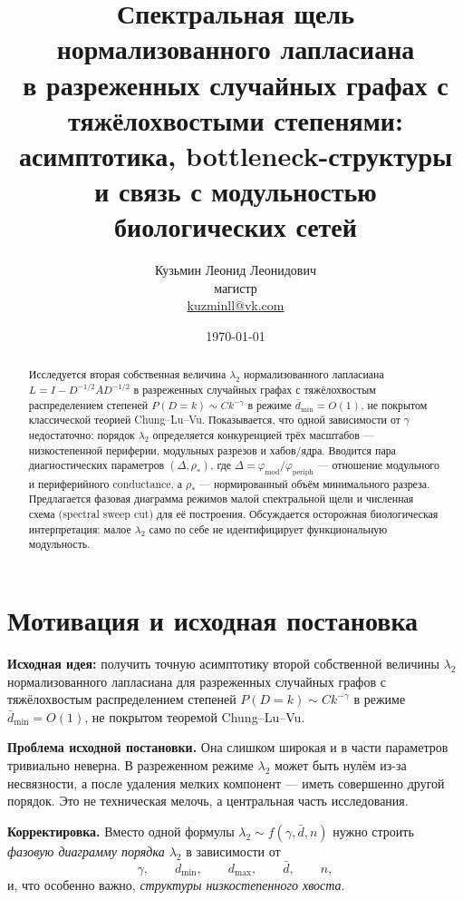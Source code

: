 \documentclass[11pt,a4paper]{article}
\title{\bfseries Спектральная щель нормализованного лапласиана\\
в разреженных случайных графах с тяжёлохвостыми степенями:\\
асимптотика, bottleneck-структуры и связь с модульностью\\
биологических сетей}
\author{Кузьмин Леонид Леонидович\\[2pt]
\small магистр\\
\small\href{mailto:kuzminll@vk.com}{kuzminll@vk.com}}
\date{\today}
\theoremstyle{plain}
\theoremstyle{definition}
\theoremstyle{remark}
\newcommand{\periph}{\mathrm{periph}}
\newcommand{\modu}{\mathrm{mod}}
\newcommand{\Ph}{\varphi}
\newcommand{\dmin}{d_{\min}}
\newcommand{\dmax}{d_{\max}}
\newcommand{\dbar}{\bar d}
\newcommand{\lamtwo}{\lambda_2}
\begin{document}
\maketitle

\begin{abstract}
\noindent
Исследуется вторая собственная величина $\lamtwo$ нормализованного лапласиана
$L=I-D^{-1/2}AD^{-1/2}$ в разреженных случайных графах с тяжёлохвостым
распределением степеней $P(D=k)\sim Ck^{-\gamma}$ в режиме
$\dbar_{\min}=O(1)$, не покрытом классической теорией Chung--Lu--Vu.
Показывается, что одной зависимости от $\gamma$ недостаточно: порядок $\lamtwo$
определяется конкуренцией трёх масштабов --- низкостепенной периферии,
модульных разрезов и хабов/ядра. Вводится пара диагностических параметров
$(\Delta,\rho_*)$, где $\Delta=\Ph_{\modu}/\Ph_{\periph}$ --- отношение
модульного и периферийного conductance, а $\rho_*$ --- нормированный объём
минимального разреза. Предлагается фазовая диаграмма режимов малой
спектральной щели и численная схема (spectral sweep cut) для её построения.
Обсуждается осторожная биологическая интерпретация: малое $\lamtwo$ само по
себе не идентифицирует функциональную модульность.
\end{abstract}

\tableofcontents

\section{Мотивация и исходная постановка}
\label{sec:motivation}

\textbf{Исходная идея:} получить точную асимптотику второй собственной величины
$\lamtwo$ нормализованного лапласиана для разреженных случайных графов с
тяжёлохвостым распределением степеней $P(D=k)\sim Ck^{-\gamma}$ в режиме
$\dbar_{\min}=O(1)$, не покрытом теоремой Chung--Lu--Vu.

\textbf{Проблема исходной постановки.} Она слишком широкая и в части параметров
тривиально неверна. В разреженном режиме $\lamtwo$ может быть нулём из-за
несвязности, а после удаления мелких компонент --- иметь совершенно другой
порядок. Это не техническая мелочь, а центральная часть исследования.

\textbf{Корректировка.} Вместо одной формулы $\lamtwo\sim f(\gamma,\dbar,n)$
нужно строить \emph{фазовую диаграмму порядка $\lamtwo$} в зависимости от
\begin{equation}
\gamma,\qquad \dmin,\qquad \dmax,\qquad \dbar,\qquad n,
\end{equation}
и, что особенно важно, \emph{структуры низкостепенного хвоста}.
\end{document}
